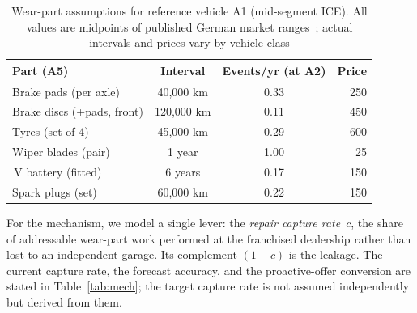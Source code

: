 \documentclass[conference,a4paper]{IEEEtran}
\newcommand{\eur}{\ifmmode\text{\texteuro}\else\texteuro\fi}
\begin{document}
\begin{table}[ht!]
\caption{Wear-part assumptions for reference vehicle A1 (mid-segment ICE). All values are midpoints of published German market ranges~\cite{adac2024repair}; actual intervals and prices vary by vehicle class}
\label{tab:wear}
\centering
\begin{tabularx}{\columnwidth}{@{} >{\raggedright\arraybackslash}X c c r @{}}
\toprule
\textbf{Part (A5)} & \textbf{Interval} & \textbf{Events/yr} (at A2) & \textbf{Price} \\
\midrule
Brake pads (per axle)      & 40{,}000 km  & 0.33 & \eur\,250 \\
Brake discs (+pads, front) & 120{,}000 km & 0.11 & \eur\,450 \\
Tyres (set of 4)           & 45{,}000 km  & 0.29 & \eur\,600 \\
Wiper blades (pair)        & 1 year       & 1.00 & \eur\,25  \\
12\,V battery (fitted)     & 6 years      & 0.17 & \eur\,150 \\
Spark plugs (set)          & 60{,}000 km  & 0.22 & \eur\,150 \\
\bottomrule
\end{tabularx}
\end{table}
 
For the mechanism, we model a single lever: the \emph{repair capture rate}~$c$,
the share of addressable wear-part work performed at the franchised dealership
rather than lost to an independent garage. Its complement $(1-c)$ is the
leakage. The current capture rate, the forecast accuracy, and the proactive-offer
conversion are stated in Table~\ref{tab:mech}; the target capture rate is not
assumed independently but derived from them.
\end{document}
